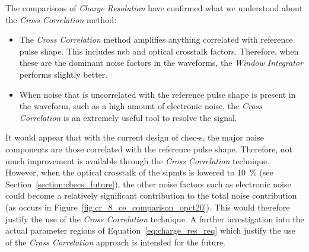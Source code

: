 The comparisons of \textit{Charge Resolution} have confirmed what we understood about the \textit{Cross Correlation} method:
\begin{itemize}
\item The \textit{Cross Correlation} method amplifies anything correlated with reference pulse shape. This includes \gls{nsb} and optical crosstalk factors. Therefore, when these are the dominant noise factors in the waveforms, the \textit{Window Integrator} performs slightly better.
\item When noise that is uncorrelated with the reference pulse shape is present in the waveform, such as a high amount of electronic noise, the \textit{Cross Correlation} is an extremely useful tool to resolve the signal.
\end{itemize}
It would appear that with the current design of \gls{chec-s}, the major noise components are those correlated with the reference pulse shape. Therefore, not much improvement is available through the \textit{Cross Correlation} technique. However, when the optical crosstalk of the \glspl{sipmt} is lowered to \SI{10}{\percent} (see Section~\ref{section:checs_future}), the other noise factors such as electronic noise could become a relatively significant contribution to the total noise contribution (as occurs in Figure~\ref{fig:cr_8_ce_comparison_opct20}). This would therefore justify the use of the \textit{Cross Correlation} technique. A further investigation into the actual parameter regions of Equation~\ref{eq:charge_res_req} which justify the use of the \textit{Cross Correlation} approach is intended for the future.